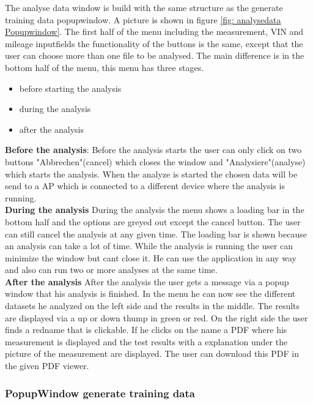 \documentclass{scrreprt}
\begin{document}
The analyse data window is build with the same structure as the generate training data popupwindow. A picture is shown in figure \ref{fig: analysedata Popupwindow}. 
The first half of the menu including the measurement, VIN and mileage inputfields the functionality of the buttons is the same, except that the user can choose more than one file to be analysed. The main difference is in the bottom half of the menu, this menu has three stages. 
\begin{itemize}
    \item before starting the analysis 
    \item during the analysis
    \item after the analysis
\end{itemize}

\textbf{Before the analysis}: 
Before the analysis starts the user can only click on two buttons "Abbrechen"(cancel) which closes the window and "Analysiere"(analyse) which starts the analysis. When the analyze is started the chosen data will be send to a AP which is connected to a different device where the analysis is running. \\

\textbf{During the analysis}
During the analysis the menu shows a loading bar in the bottom half and the options are greyed out except the cancel button. The user can still cancel the analysis at any given time. 
The loading bar is shown because an analysis can take a lot of time. While the analysis is running the user can minimize the window but cant close it. He can use the application in any way and also can run two or more analyses at the same time.\\

\textbf{After the analysis}
After the analysis the user gets a message via a popup window that his analysis is finished. In the menu he can now see the different datasets he analyzed on the left side and the results in the middle. 
The results are displayed via a up or down thump in green or red. On the right side the user finds a redname that is clickable. If he clicks on the name a PDF where his measurement is displayed and the test results with a explanation under the picture of the measurement are displayed. The user can download this PDF in the given PDF viewer.  



\subsubsection{PopupWindow generate training data}\label{cap: PopupWindow_generate_training_data}
\end{document}
